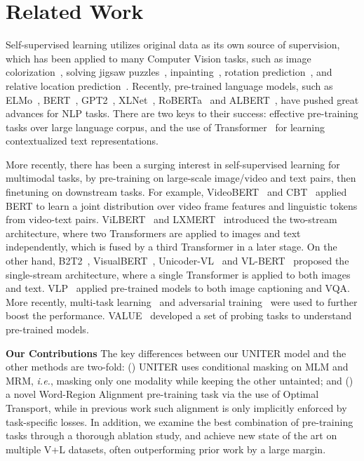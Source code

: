 \documentclass[runningheads]{llncs}
\begin{document}
 \section{Related Work}

Self-supervised learning utilizes original data as its own source of supervision, which has been applied to many Computer Vision tasks, such as
image colorization~\cite{zhang2016colorful}, solving jigsaw puzzles~\cite{noroozi2016unsupervised,trinh2019selfie}, inpainting~\cite{pathak2016context}, rotation prediction~\cite{gidaris2018unsupervised}, and relative location prediction~\cite{doersch2015unsupervised}.
Recently, pre-trained language models, such as
ELMo~\cite{peters2018deep},
BERT~\cite{devlin2018bert}, GPT2~\cite{radford2019language},
XLNet~\cite{yang2019xlnet}, RoBERTa~\cite{liu2019roberta} and ALBERT~\cite{lan2019albert}, 
have pushed great advances for NLP tasks.
There are two keys to their success: 
effective pre-training tasks over large language corpus, and the use of Transformer~\cite{vaswani2017attention} for learning contextualized text representations.

More recently, there has been a surging interest in self-supervised learning for multimodal tasks,
by pre-training on large-scale image/video and text pairs, then finetuning on downstream tasks.
For example, VideoBERT~\cite{sun2019videobert} and CBT~\cite{sun2019contrastive} applied BERT to learn a joint distribution over video frame features and linguistic tokens from video-text pairs.
ViLBERT~\cite{lu2019vilbert} and LXMERT~\cite{tan2019lxmert} introduced the two-stream architecture, where two Transformers are applied to images and text independently, which is fused by a third Transformer in a later stage.
On the other hand, B2T2~\cite{alberti2019fusion}, VisualBERT~\cite{li2019visualbert}, Unicoder-VL~\cite{li2019unicoder} and VL-BERT~\cite{su2019vl} proposed the single-stream architecture, where a single Transformer is applied to both images and text. VLP~\cite{zhou2019unified} applied pre-trained models to both image captioning and VQA. 
More recently, multi-task learning~\cite{lu201912} and adversarial training~\cite{gan2020large} were used to further boost the performance. VALUE~\cite{cao2020behind} developed a set of probing tasks to understand pre-trained models. 

\noindent \textbf{Our Contributions} The key differences between our UNITER model and the other methods are two-fold: () UNITER uses conditional masking on MLM and MRM, \emph{i.e.}, masking only one modality while keeping the other untainted; and () a novel Word-Region Alignment pre-training task via the use of Optimal Transport, while in previous work such alignment is only implicitly enforced by task-specific losses.
In addition, we examine the best combination of pre-training tasks through a thorough ablation study,
and achieve new state of the art on multiple V+L datasets, often outperforming prior work by a large margin. 
\end{document}
